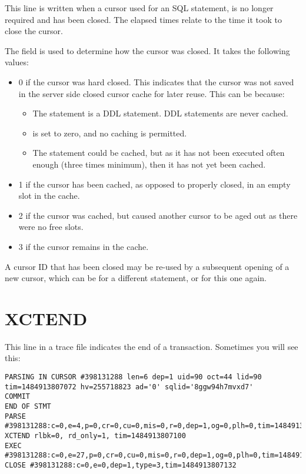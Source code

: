 This line is written when a cursor used for an SQL statement, is no longer required and has been closed. The elapsed times relate to the time it took to close the cursor.

The  field is used to determine how the cursor was closed. It takes the following values:

\begin{itemize}
\tightlist
\item
  0 if the cursor was hard closed. This indicates that the cursor was   not saved in the server side closed cursor cache for later reuse. This can be because:

  \begin{itemize}
  \tightlist
  \item
    The statement is a DDL statement. DDL statements are never cached.
  \item
     is set to zero, and no caching is permitted.
  \item
    The statement could be cached, but as it has not been executed often enough (three times minimum), then it has not yet been cached.
  \end{itemize}
\item
  1 if the cursor has been cached, as opposed to properly closed, in an empty slot in the cache.
\item
  2 if the cursor was cached, but caused another cursor to be aged out as there were no free slots.
\item
  3 if the cursor remains in the cache.
\end{itemize}

A cursor ID that has been closed may be re-used by a subsequent opening of a new cursor, which can be for a different statement, or for this one again. 

\newpage\section{XCTEND}\label{xctend}

This line in a trace file indicates the end of a transaction. Sometimes you will see this:

\begin{lstlisting}[numbers=none,caption={Commit Statement with Xctend Line}]
PARSING IN CURSOR #398131288 len=6 dep=1 uid=90 oct=44 lid=90 tim=1484913807072 hv=255718823 ad='0' sqlid='8ggw94h7mvxd7'
COMMIT
END OF STMT
PARSE #398131288:c=0,e=4,p=0,cr=0,cu=0,mis=0,r=0,dep=1,og=0,plh=0,tim=1484913807071
XCTEND rlbk=0, rd_only=1, tim=1484913807100
EXEC #398131288:c=0,e=27,p=0,cr=0,cu=0,mis=0,r=0,dep=1,og=0,plh=0,tim=1484913807121
CLOSE #398131288:c=0,e=0,dep=1,type=3,tim=1484913807132
\end{lstlisting}

